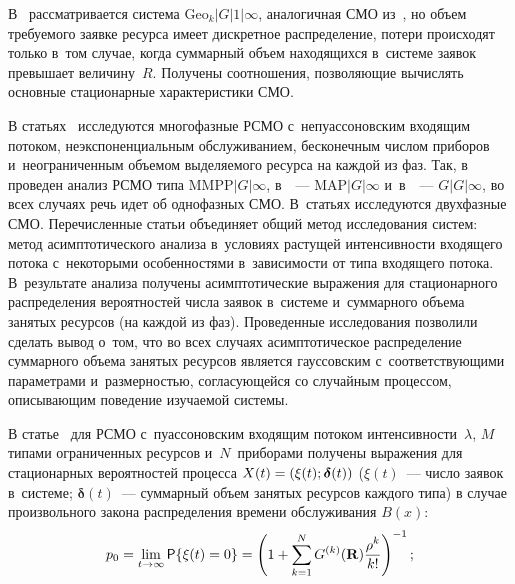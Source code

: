 \begin{multicols}{2}
В~\cite{Pechinkin_29_2012} рассматривается сис\-те\-ма $\mathrm{Geo}_k|G|1|\infty$, 
аналогичная СМО из~\cite{Pechinkin_28_2011}, но объем требуемого заявке ресурса 
имеет дискретное распределение, потери происходят только в~том случае, когда 
суммарный объем находящихся в~сис\-те\-ме заявок превышает величину~$R$. Получены 
соотношения, позволяющие вычислять основные стационарные характеристики СМО.

В статьях~\cite{Mois_1_2017,Mois_2_2017,Mois_3_2016,Mois_4_2017,Mois_5_2017} 
исследуются многофазные РСМО с~непуассоновским входящим потоком, 
неэкспоненциальным обслуживанием, бесконечным числом приборов и~неограниченным 
объемом выделяемого ресурса на каждой из фаз. Так, в~\cite{Mois_2_2017} проведен 
анализ РСМО типа $\mathrm{MMPP}|G|\infty$, в~\cite{Mois_3_2016}~--- $\mathrm{MAP}|G|\infty$ 
и~в~\cite{Mois_1_2017}~--- $G|G|\infty$, во всех случаях речь идет об однофазных 
СМО.
В~статьях \cite{Mois_4_2017,Mois_5_2017} исследуются двухфазные СМО.
Перечисленные статьи объединяет общий метод исследования сис\-тем: метод 
асимптотического анализа в~условиях растущей интенсивности входящего потока 
с~некоторыми особенностями в~зависимости от типа входящего потока. В~результате 
анализа получены асимптотические выражения для стационарного распределения 
вероятностей числа заявок в~сис\-те\-ме и~суммарного объема занятых ресурсов (на 
каждой из фаз). Проведенные исследования позволили сделать вывод о~том, что во 
всех случаях асимптотическое распределение суммарного объема занятых ресурсов 
является гауссовским с~соответствующими параметрами и~размерностью, 
согласующейся со случайным процессом, описывающим поведение изучаемой сис\-темы.

В статье~\cite{Naumov_18_2016} для РСМО с~пуассоновским входящим потоком 
интенсивности~$\lambda$, $M$ типами ограниченных ресурсов и~$N$~приборами 
получены выражения для стационарных вероятностей процесса 
$X(t)\hm=(\xi(t);\boldsymbol{\delta}(t))$ ($\xi(t)$~--- число заявок в~сис\-те\-ме; 
$\boldsymbol{\delta}(t)$~--- суммарный объем занятых ресурсов каждого типа)
в случае произвольного закона распределения времени обслуживания $B(x)$:
\begin{equation*}
p_0=\lim\limits_{t\rightarrow \infty}{\sf P}\{\xi(t)=0\}=\left(1+\sum\limits_{k=1}^{N}
G^{(k)}(\mathbf{R})\displaystyle\frac{\displaystyle \rho^{k}\mathstrut}{\displaystyle k!\mathstrut} \right ) ^{-1};
\end{equation*}

\vspace*{-12pt}


\end{multicols}
